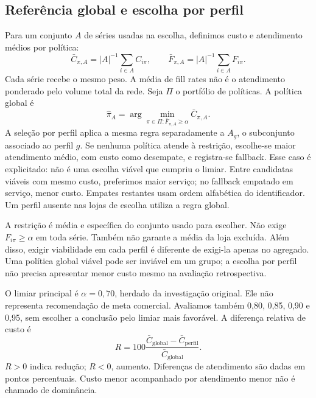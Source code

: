 \documentclass[preprint,12pt]{elsarticle}
\begin{document}
\subsection{Referência global e escolha por perfil}
Para um conjunto $A$ de séries usadas na escolha, definimos custo e atendimento médios por política:
\begin{equation}
 \bar C_{\pi,A}=|A|^{-1}\sum_{i\in A}C_{i\pi},\qquad
 \bar F_{\pi,A}=|A|^{-1}\sum_{i\in A}F_{i\pi}.
\end{equation}
Cada série recebe o mesmo peso. A média de fill rates não é o atendimento ponderado pelo volume total da rede. Seja $\Pi$ o portfólio de políticas. A política global é
\begin{equation}
 \widehat\pi_A=\arg\min_{\pi\in\Pi:\bar F_{\pi,A}\geq\alpha}\bar C_{\pi,A}.
\end{equation}
A seleção por perfil aplica a mesma regra separadamente a $A_g$, o subconjunto associado ao perfil $g$. Se nenhuma política atende à restrição, escolhe-se maior atendimento médio, com custo como desempate, e registra-se fallback. Esse caso é explicitado: não é uma escolha viável que cumpriu o limiar. Entre candidatas viáveis com mesmo custo, preferimos maior serviço; no fallback empatado em serviço, menor custo. Empates restantes usam ordem alfabética do identificador. Um perfil ausente nas lojas de escolha utiliza a regra global.

A restrição é média e específica do conjunto usado para escolher. Não exige $F_{i\pi}\geq\alpha$ em toda série. Também não garante a média da loja excluída. Além disso, exigir viabilidade em cada perfil é diferente de exigi-la apenas no agregado. Uma política global viável pode ser inviável em um grupo; a escolha por perfil não precisa apresentar menor custo mesmo na avaliação retrospectiva.

O limiar principal é $\alpha=0{,}70$, herdado da investigação original. Ele não representa recomendação de meta comercial. Avaliamos também 0,80, 0,85, 0,90 e 0,95, sem escolher a conclusão pelo limiar mais favorável. A diferença relativa de custo é
\begin{equation}
 R=100\frac{\bar C_{\mathrm{global}}-\bar C_{\mathrm{perfil}}}{\bar C_{\mathrm{global}}}.
\end{equation}
$R>0$ indica redução; $R<0$, aumento. Diferenças de atendimento são dadas em pontos percentuais. Custo menor acompanhado por atendimento menor não é chamado de dominância.
\end{document}
